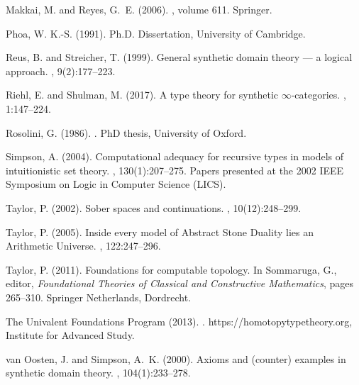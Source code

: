 \documentclass{msc}
\theoremstyle{theormstyle}
\theoremstyle{remarkstyle}
\begin{document}
\begin{thebibliography}{}
Makkai, M. and Reyes, G.~E. (2006).
, volume 611.
\newblock Springer.

Phoa, W. K.-S. (1991).
\newblock Ph.D. Dissertation, University of Cambridge.

Reus, B. and Streicher, T. (1999).
\newblock General synthetic domain theory --- a logical approach.
, 9(2):177--223.

Riehl, E. and Shulman, M. (2017).
\newblock A type theory for synthetic $\infty$-categories.
, 1:147--224.

Rosolini, G. (1986).
.
\newblock PhD thesis, University of Oxford.

Simpson, A. (2004).
\newblock Computational adequacy for recursive types in models of intuitionistic set theory.
, 130(1):207--275.
\newblock Papers presented at the 2002 IEEE Symposium on Logic in Computer Science (LICS).

Taylor, P. (2002).
\newblock Sober spaces and continuations.
, 10(12):248--299.

Taylor, P. (2005).
\newblock Inside every model of {Abstract Stone Duality} lies an {Arithmetic Universe}.
, 122:247--296.

Taylor, P. (2011).
\newblock Foundations for computable topology.
\newblock In Sommaruga, G., editor, {\em Foundational Theories of Classical and Constructive Mathematics}, pages 265--310. Springer Netherlands, Dordrecht.

{The Univalent Foundations Program} (2013).
.
\newblock \textsf{https://homotopytypetheory.org}, Institute for Advanced Study.

{van Oosten}, J. and Simpson, A.~K. (2000).
\newblock Axioms and (counter) examples in synthetic domain theory.
, 104(1):233--278.

\end{thebibliography}
\end{document}
